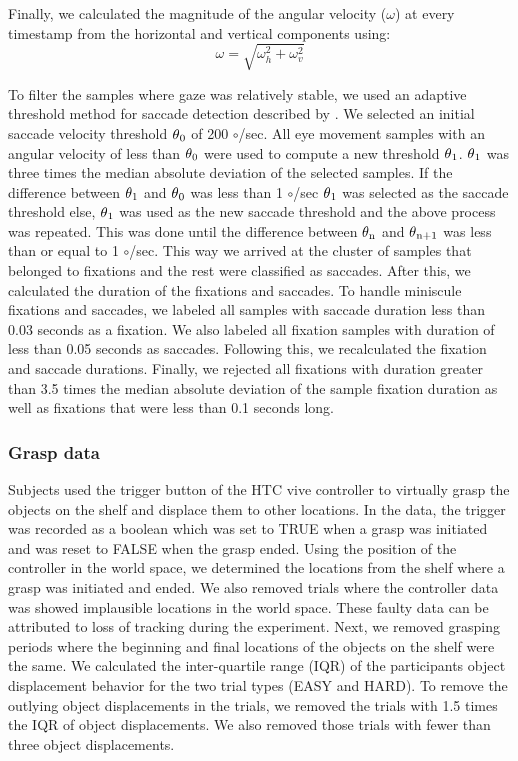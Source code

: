 Finally, we calculated the magnitude of the angular velocity ($\omega$) at every timestamp from the horizontal and vertical components using:
\begin{equation*}\label{eq:vel_angle}
     \omega = \sqrt{\omega_h^2 + \omega_v^2}
 \end{equation*}  

To filter the samples where gaze was relatively stable, we used an adaptive threshold method for saccade detection described by \citet{Voloh2019-oc}. We selected an initial saccade velocity threshold $\theta\textsubscript{0}$ of 200 $\circ$/sec. All eye movement samples with an angular velocity of less than $\theta\textsubscript{0}$ were used to compute a new threshold $\theta\textsubscript{1}$. $\theta\textsubscript{1}$ was three times the median absolute deviation of the selected samples. If the difference between $\theta\textsubscript{1}$ and $\theta\textsubscript{0}$ was less than 1 $\circ$/sec $\theta\textsubscript{1}$ was selected as the saccade threshold else, $\theta\textsubscript{1}$ was used as the new saccade threshold and the above process was repeated. This was done until the difference between $\theta\textsubscript{n}$ and $\theta\textsubscript{n+1}$ was less than or equal to 1 $\circ$/sec. This way we arrived at the cluster of samples that belonged to fixations and the rest were classified as saccades. After this, we calculated the duration of the fixations and saccades. To handle miniscule fixations and saccades, we labeled all samples with saccade duration less than 0.03 seconds as a fixation. We also labeled all fixation samples with duration of less than 0.05 seconds as saccades. Following this, we recalculated the fixation and saccade durations. Finally, we rejected all fixations with duration greater than 3.5 times the median absolute deviation of the sample fixation duration as well as fixations that were less than 0.1 seconds long. 


\subsubsection{Grasp data}

Subjects used the trigger button of the HTC vive controller to virtually grasp the objects on the shelf and displace them to other locations. In the data, the trigger was recorded as a boolean which was set to TRUE when a grasp was initiated and was reset to FALSE when the grasp ended. Using the position of the controller in the world space, we determined the locations from the shelf where a grasp was initiated and ended. We also removed trials where the controller data was showed implausible locations in the world space. These faulty data can be attributed to loss of tracking during the experiment. Next, we removed grasping periods where the beginning and final locations of the objects on the shelf were the same. We calculated the inter-quartile range (IQR) of the participants object displacement behavior for the two trial types (EASY and HARD). To remove the outlying object displacements in the trials, we removed the trials with 1.5 times the IQR of object displacements. We also removed those trials with fewer than three object displacements. 

